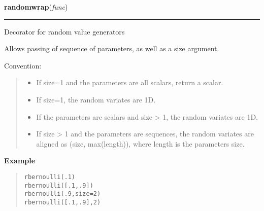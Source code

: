     \begin{boxedminipage}{\textwidth}

    \raggedright \textbf{randomwrap}(\textit{func})

    \vspace{-1.5ex}

    \rule{\textwidth}{0.5\fboxrule}

Decorator for random value generators

Allows passing of sequence of parameters, as well as a size argument.

Convention:
\begin{quote}
\begin{itemize}
\item {} 
If size=1 and the parameters are all scalars, return a scalar.

\item {} 
If size=1, the random variates are 1D.

\item {} 
If the parameters are scalars and size {\textgreater} 1, the random variates are 1D.

\item {} 
If size {\textgreater} 1 and the parameters are sequences, the random variates are
aligned as (size, max(length)), where length is the parameters size.

\end{itemize}
\end{quote}
    \vspace{1ex}

      \textbf{Example}
      \begin{quote}
          \begin{alltt}
\pysrcprompt{{\textgreater}{\textgreater}{\textgreater} }rbernoulli(.1)
\pysrcoutput{}\pysrcprompt{{\textgreater}{\textgreater}{\textgreater} }rbernoulli([.1,.9])
\pysrcoutput{}\pysrcprompt{{\textgreater}{\textgreater}{\textgreater} }rbernoulli(.9, size=2)
\pysrcoutput{}\pysrcprompt{{\textgreater}{\textgreater}{\textgreater} }rbernoulli([.1,.9], 2)
\pysrcoutput{asarray([[0, 1],}
\pysrcoutput{       [0, 1]])}\end{alltt}
      \end{quote}

    \vspace{1ex}

    \end{boxedminipage}

    \label{pymc:distributions:debugwrapper}

